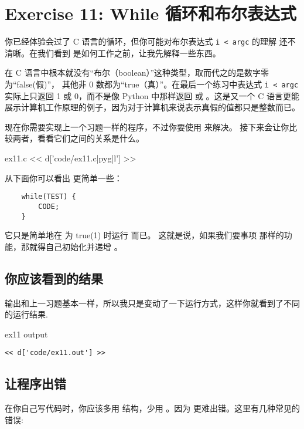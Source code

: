 \chapter{Exercise 11: While 循环和布尔表达式}

你已经体验会过了 C 语言的循环，但你可能对布尔表达式 \verb|i < argc| 的理解
还不清晰。在我们看到  是如何工作之前，让我先解释一些东西。

在 C 语言中根本就没有“布尔（boolean）”这种类型，取而代之的是数字零为“false(假)”，
其他非 0 数都为“true（真）”。在最后一个练习中表达式 \verb|i < argc| 实际上只返回 
1 或 0，而不是像 Python 中那样返回  或 。这是又一个 C 
语言更能展示计算机工作原理的例子，因为对于计算机来说表示真假的值都只是整数而已。

现在你需要实现上一个习题一样的程序，不过你要使用 来解决。 
接下来会让你比较两者，看看它们之间的关系是什么。

\begin{code}{ex11.c}
<< d['code/ex11.c|pyg|l'] >>
\end{code}

从下面你可以看出  更简单一些：

\begin{Verbatim}
    while(TEST) {
        CODE;
    }
\end{Verbatim}

它只是简单地在  为 true(1) 时运行 而已。
这就是说，如果我们要事项  那样的功能，那就得自己初始化并递增 。

\section{你应该看到的结果}

输出和上一习题基本一样，所以我只是变动了一下运行方式，这样你就看到了不同的运行结果.

\begin{code}{ex11 output}
\begin{lstlisting}
<< d['code/ex11.out'] >>
\end{lstlisting}
\end{code}

\section{让程序出错}

在你自己写代码时，你应该多用 结构，少用 。因为
 更难出错。这里有几种常见的错误:

